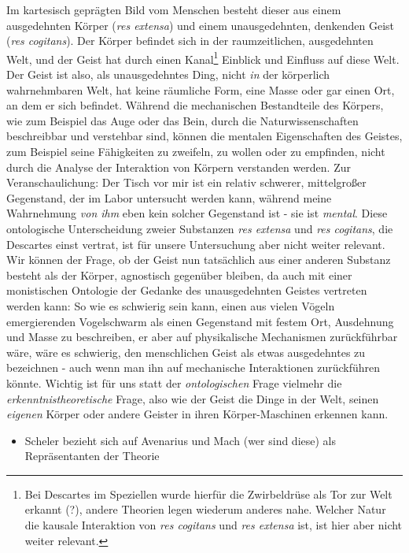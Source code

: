 \documentclass[a4paper, 12pt]{article}
\begin{document}
\begin{onehalfspace}
\noindent Im kartesisch geprägten Bild vom Menschen besteht dieser aus einem ausgedehnten Körper (\emph{res extensa}) und einem unausgedehnten, denkenden Geist (\emph{res cogitans}). Der Körper befindet sich in der raumzeitlichen, ausgedehnten Welt, und der Geist hat durch einen Kanal\footnote{Bei Descartes im Speziellen wurde hierfür die Zwirbeldrüse als Tor zur Welt erkannt (?), andere Theorien legen wiederum anderes nahe. Welcher Natur die kausale Interaktion von \emph{res cogitans} und \emph{res extensa} ist, ist hier aber nicht weiter relevant.} Einblick und Einfluss auf diese Welt. Der Geist ist also, als unausgedehntes Ding, nicht \emph{in} der körperlich wahrnehmbaren Welt, hat keine räumliche Form, eine Masse oder gar einen Ort, an dem er sich befindet. Während die mechanischen Bestandteile des Körpers, wie zum Beispiel das Auge oder das Bein, durch die Naturwissenschaften beschreibbar und verstehbar sind, können die mentalen Eigenschaften des Geistes, zum Beispiel seine Fähigkeiten zu zweifeln, zu wollen oder zu empfinden, nicht durch die Analyse der Interaktion von Körpern verstanden werden. Zur Veranschaulichung:  Der Tisch vor mir ist ein relativ schwerer, mittelgroßer Gegenstand, der im Labor untersucht werden kann, während meine Wahrnehmung \emph{von ihm} eben kein solcher Gegenstand ist - sie ist \emph{mental}. Diese ontologische Unterscheidung zweier Substanzen \emph{res extensa} und \emph{res cogitans}, die Descartes einst vertrat, ist für unsere Untersuchung aber nicht weiter relevant. Wir können der Frage, ob der Geist nun tatsächlich aus einer anderen Substanz besteht als der Körper, agnostisch gegenüber bleiben, da auch mit einer monistischen Ontologie der Gedanke des unausgedehnten Geistes vertreten werden kann: So wie es schwierig sein kann, einen aus vielen Vögeln emergierenden Vogelschwarm als einen Gegenstand mit festem Ort, Ausdehnung und Masse zu beschreiben, er aber auf physikalische Mechanismen zurückführbar wäre, wäre es schwierig, den menschlichen Geist als etwas ausgedehntes zu bezeichnen - auch wenn man ihn auf mechanische Interaktionen zurückführen könnte. Wichtig ist für uns statt der \emph{ontologischen} Frage vielmehr die \emph{erkenntnistheoretische} Frage, also wie der Geist die Dinge in der Welt, seinen \emph{eigenen} Körper oder andere Geister in ihren Körper-Maschinen erkennen kann.

\begin{itemize}
  \item Scheler bezieht sich auf Avenarius und Mach (wer sind diese) als Repräsentanten der Theorie
\end{itemize}



\end{onehalfspace}
\end{document}
